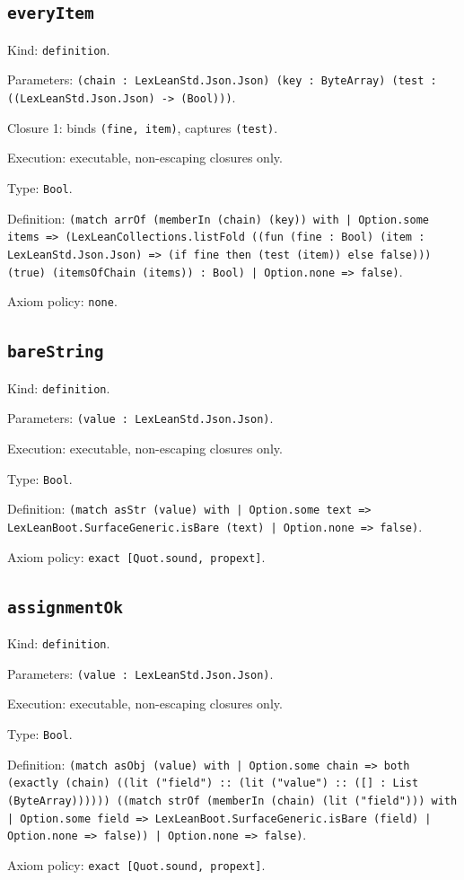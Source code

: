 \documentclass[11pt]{article}
\begin{document}
\subsection*{\texttt{everyItem}}
\noindent Kind: \texttt{definition}.\par
\noindent Parameters: \texttt{(chain : LexLeanStd.Json.Json) (key : ByteArray) (test : ((LexLeanStd.Json.Json) -> (Bool)))}.\par
\noindent Closure 1: binds \texttt{(fine, item)}, captures \texttt{(test)}.\par
\noindent Execution: executable, non-escaping closures only.\par
\noindent Type: \texttt{Bool}.\par
\noindent Definition: \texttt{(match arrOf (memberIn (chain) (key)) with | Option.some items => (LexLeanCollections.listFold ((fun (fine : Bool) (item : LexLeanStd.Json.Json) => (if fine then (test (item)) else false))) (true) (itemsOfChain (items)) : Bool) | Option.none => false)}.\par
\noindent Axiom policy: \texttt{none}.\par
\subsection*{\texttt{bareString}}
\noindent Kind: \texttt{definition}.\par
\noindent Parameters: \texttt{(value : LexLeanStd.Json.Json)}.\par
\noindent Execution: executable, non-escaping closures only.\par
\noindent Type: \texttt{Bool}.\par
\noindent Definition: \texttt{(match asStr (value) with | Option.some text => LexLeanBoot.SurfaceGeneric.isBare (text) | Option.none => false)}.\par
\noindent Axiom policy: \texttt{exact [Quot.sound, propext]}.\par
\subsection*{\texttt{assignmentOk}}
\noindent Kind: \texttt{definition}.\par
\noindent Parameters: \texttt{(value : LexLeanStd.Json.Json)}.\par
\noindent Execution: executable, non-escaping closures only.\par
\noindent Type: \texttt{Bool}.\par
\noindent Definition: \texttt{(match asObj (value) with | Option.some chain => both (exactly (chain) ((lit ("field") :: (lit ("value") :: ([] : List (ByteArray)))))) ((match strOf (memberIn (chain) (lit ("field"))) with | Option.some field => LexLeanBoot.SurfaceGeneric.isBare (field) | Option.none => false)) | Option.none => false)}.\par
\noindent Axiom policy: \texttt{exact [Quot.sound, propext]}.\par
\end{document}
